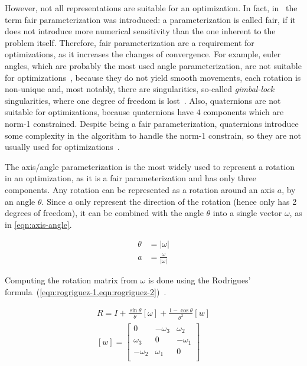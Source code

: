 However, not all representations are suitable for an optimization. In fact, in~\cite{hornegger99} the term fair parameterization was introduced: a parameterization is called fair, if it does not introduce more numerical sensitivity than the one inherent to the problem itself. Therefore, fair parameterization are a requirement for optimizations, as it increases the changes of convergence. For example, euler angles, which are probably the most used angle parameterization, are not suitable for optimizations~\cite{schmidt01}, because they do not yield smooth movements, each rotation is non-unique and, most notably, there are singularities, so-called \textit{gimbal-lock} singularities, where one degree of freedom is lost~\cite{schmidt01}. Also, quaternions are not suitable for optimizations, because quaternions have $4$ components which are norm-1 constrained. Despite being a fair parameterization, quaternions introduce some complexity in the algorithm to handle the norm-1 constrain, so they are not usually used for optimizations~\cite{schmidt01}.

The axis/angle parameterization is the most widely used to represent a rotation in an optimization, as it is a fair parameterization and has only three components. Any rotation can be represented as a rotation around an axis $a$, by an angle $\theta$. Since $a$ only represent the direction of the rotation (hence only has 2 degrees of freedom), it can be combined with the angle $\theta$ into a single vector $\omega$, as in \cref{eqn:axis-angle}.

\begin{equation}
    \label{eqn:axis-angle}
    \begin{aligned}
        \theta & = |\omega| \\
        a & = \frac{\omega}{|\omega|}
    \end{aligned}
\end{equation}

Computing the rotation matrix from $\omega$ is done using the Rodrigues' formula~(\cref{eqn:rogriguez-1,eqn:rogriguez-2})~\cite{schmidt01}.

\begin{align}
    \label{eqn:rogriguez-1}
    R = I + \frac{\sin \theta}{\theta} [\omega] + \frac{1 - \cos \theta}{\theta^2} [w] \\
    \label{eqn:rogriguez-2}
    [w] = \left[
        \begin{array}{ccc}
            0  & -\omega_3 & \omega_2 \\
            \omega_3 & 0   & -\omega_1 \\
            -\omega_2 & \omega_1 & 0 \\
        \end{array}
    \right]
\end{align}

